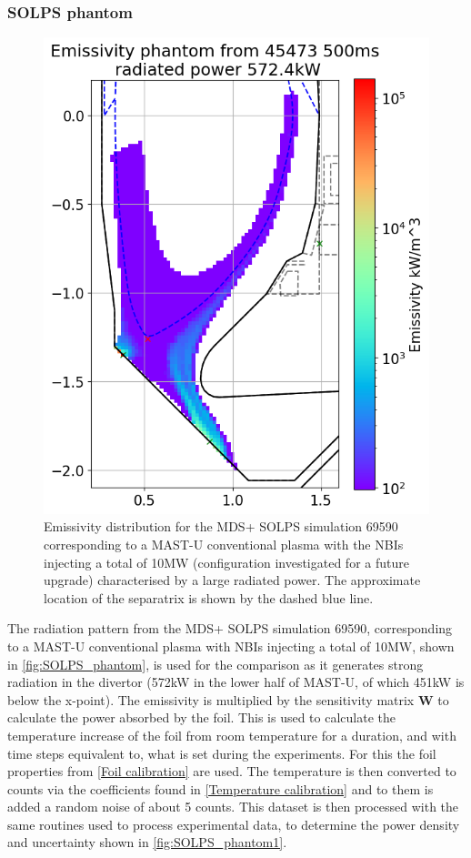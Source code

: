 \subsubsection{SOLPS phantom}\label{SOLPS phantom}

\begin{figure}[!ht]
	\centering
	\includegraphics[trim={0 0 0 45},clip,width=0.5\linewidth]{Chapters/chapter2/figs/inversion_comparison_phantom_SOLPS_pantom_test.png}
	\caption{Emissivity distribution for the MDS+ SOLPS simulation 69590 corresponding to a MAST-U conventional plasma with the NBIs injecting a total of 10MW (configuration investigated for a future upgrade) characterised by a large radiated power. The approximate location of the separatrix is shown by the dashed blue line.}
	\label{fig:SOLPS_phantom}
\end{figure}

The radiation pattern from the MDS+\cite{MDSplus2020} SOLPS simulation 69590, corresponding to a MAST-U conventional plasma with NBIs injecting a total of 10MW, shown in \autoref{fig:SOLPS_phantom}, is used for the comparison as it generates strong radiation in the divertor (572kW in the lower half of MAST-U, of which 451kW is below the x-point). The emissivity is multiplied by the sensitivity matrix $\bm{W}$ to calculate the power absorbed by the foil. This is used to calculate the temperature increase of the foil from room temperature for a duration, and with time steps equivalent to, what is set during the experiments. For this the foil properties from \autoref{Foil calibration} are used. The temperature is then converted to counts via the coefficients found in \autoref{Temperature calibration} and to them is added a random noise of about 5 counts. This dataset is then processed with the same routines used to process experimental data, to determine the power density and uncertainty shown in \autoref{fig:SOLPS_phantom1}.

